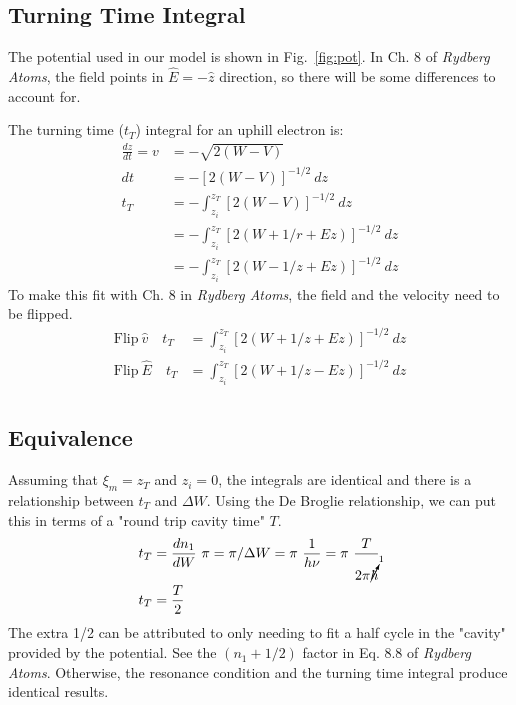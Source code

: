 \documentclass[aps,pra,preprint,groupedaddress]{revtex4-1}
\begin{document}
\subsection{\label{sec:tt} Turning Time Integral}

The potential used in our model is shown in Fig.~\ref{fig:pot}. In Ch. 8 of \emph{Rydberg Atoms}, the field points in $\hat{E} = -\hat{z}$ direction, so there will be some differences to account for.

The turning time ($t_T$) integral for an uphill electron is:
\begin{align*}
\frac{dz}{dt} = v & = - \sqrt{2(W - V)} \\
dt & = - [2(W - V)]^{-1/2} ~ dz \\
t_T & = - \int_{z_i}^{z_T} [2(W - V)]^{-1/2} ~ dz \\
 & = - \int_{z_i}^{z_T} [2(W + 1/r + Ez)]^{-1/2} ~ dz \\
 & = - \int_{z_i}^{z_T} [2(W - 1/z + Ez)]^{-1/2} ~ dz
\end{align*}
To make this fit with Ch. 8 in \emph{Rydberg Atoms}, the field and the velocity need to be flipped.
\begin{align*}
\text{Flip} ~ \hat{v} \quad t_T & = \int_{z_i}^{z_T} [2(W + 1/z + Ez)]^{-1/2} ~ dz \\
\text{Flip} ~ \hat{E} \quad t_T & = \int_{z_i}^{z_T} [2(W + 1/z - Ez)]^{-1/2} ~ dz \\
\end{align*}

\subsection{\label{sec:eq} Equivalence}

Assuming that $\xi_m = z_T$ and $z_i = 0$, the integrals are identical and there is a relationship between $t_T$ and $\Delta W$. Using the De Broglie relationship, we can put this in terms of a "round trip cavity time" $T$.
\begin{align*}
t_T & = \frac{dn_1}{dW} ~ \pi
 = \pi / \Delta W
 = \pi ~ \frac{1}{h \nu}
 = \pi ~ \frac{T}{2 \pi \cancelto{1}{\hbar}} \\
t_T & = \frac{T}{2}
\end{align*}
The extra 1/2 can be attributed to only needing to fit a half cycle in the "cavity" provided by the potential. See the $(n_1 + 1/2)$ factor in Eq. 8.8 of \emph{Rydberg Atoms}. Otherwise, the resonance condition and the turning time integral produce identical results.
\end{document}
